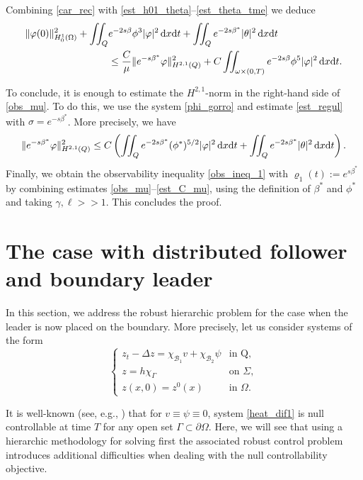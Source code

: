 \documentclass{aims}
\theoremstyle{definition}
\def\cbd{\Gamma}
\newcommand\csin[1]{\chi_{#1}}
\def\dx{\,\textnormal{d}x}
\def\dt{\textnormal{d}t}
\begin{document}
Combining \eqref{car_rec} with \eqref{est_h01_theta}--\eqref{est_theta_tme} we deduce
%
\begin{equation}\label{obs_mu}
\begin{split}
\|\varphi(0)\|_{H_0^1(\Omega)}^2+\iint_{Q}&e^{-2s\beta}\phi^3|\varphi|^2\dx\dt+\iint_{Q}e^{-2s\beta^*}|\theta|^2\dx\dt \\
&\leq \frac{C}{\mu}\|e^{-s\beta^*}\varphi\|_{H^{2,1}(Q)}^2+ C\iint_{\omega\times(0,T)}e^{-2s\beta}\phi^5|\varphi|^2\dx\dt.
\end{split}
\end{equation}
%

To conclude, it is enough to estimate the $H^{2,1}$-norm in the right-hand side of \eqref{obs_mu}. To do this, we use the system \eqref{phi_gorro} and estimate \eqref{est_regul} with $\sigma=e^{-s\beta^*}$. More precisely, we have 
%
\begin{equation}\label{est_C_mu}
\|e^{-s\beta^*}\varphi\|^2_{H^{2,1}(Q)}\leq C\left(\iint_{Q}e^{-2s\beta^*}(\phi^*)^{5/2}|\varphi|^2\dx\dt+\iint_{Q}e^{-2s\beta^*}|\theta|^2\dx\dt\right).
\end{equation}
%
Finally, we obtain the observability inequality \eqref{obs_ineq_1} with $\varrho_1(t):=e^{s\beta^*}$ by combining estimates \eqref{obs_mu}--\eqref{est_C_mu}, using the definition of $\beta^*$ and $\phi^*$ and taking $\gamma,\ell>>1$. This concludes the proof. 

\section{The case with distributed follower and boundary leader}\label{sec_bound_leader}

In this section, we address the robust hierarchic problem for the case when the leader is now placed on the boundary. More precisely, let us consider systems of the form
%
\begin{equation}\label{heat_dif1}
\begin{cases}
z_t-\Delta z=\csin{\mathcal B_1}v+\csin{\mathcal B_2}\psi & \text{in Q}, \\
z=h\chi_{\cbd} &\text{on } \Sigma, \\
z(x,0)=z^0(x) & \text{in } \Omega.
\end{cases}
\end{equation}

It is well-known (see, e.g., \cite{ima_original,cara_guerrero}) that for $v\equiv\psi\equiv 0$, system \eqref{heat_dif1} is null controllable at time $T$ for any open set $\Gamma\subset\partial \Omega$. Here, we will see that using a hierarchic methodology for solving first the associated robust control problem introduces additional difficulties when dealing with the null controllability objective. 
\end{document}
